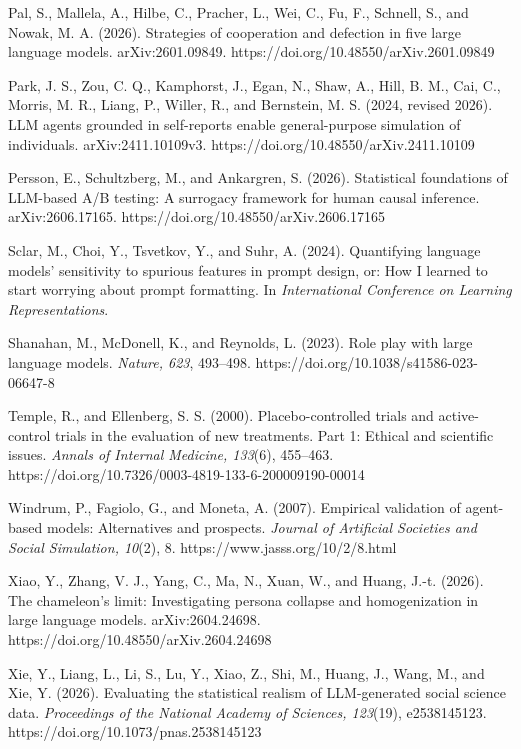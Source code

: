 \documentclass[
  11pt]{article}
\begin{document}
Pal, S., Mallela, A., Hilbe, C., Pracher, L., Wei, C., Fu, F., Schnell,
S., and Nowak, M. A. (2026). Strategies of cooperation and defection in
five large language models. arXiv:2601.09849.
https://doi.org/10.48550/arXiv.2601.09849

Park, J. S., Zou, C. Q., Kamphorst, J., Egan, N., Shaw, A., Hill, B. M.,
Cai, C., Morris, M. R., Liang, P., Willer, R., and Bernstein, M. S.
(2024, revised 2026). LLM agents grounded in self-reports enable
general-purpose simulation of individuals. arXiv:2411.10109v3.
https://doi.org/10.48550/arXiv.2411.10109

Persson, E., Schultzberg, M., and Ankargren, S. (2026). Statistical
foundations of LLM-based A/B testing: A surrogacy framework for human
causal inference. arXiv:2606.17165.
https://doi.org/10.48550/arXiv.2606.17165

Sclar, M., Choi, Y., Tsvetkov, Y., and Suhr, A. (2024). Quantifying
language models' sensitivity to spurious features in prompt design, or:
How I learned to start worrying about prompt formatting. In
\emph{International Conference on Learning Representations}.

Shanahan, M., McDonell, K., and Reynolds, L. (2023). Role play with
large language models. \emph{Nature, 623}, 493--498.
https://doi.org/10.1038/s41586-023-06647-8

Temple, R., and Ellenberg, S. S. (2000). Placebo-controlled trials and
active-control trials in the evaluation of new treatments. Part 1:
Ethical and scientific issues. \emph{Annals of Internal Medicine,
133}(6), 455--463.
https://doi.org/10.7326/0003-4819-133-6-200009190-00014

Windrum, P., Fagiolo, G., and Moneta, A. (2007). Empirical validation of
agent-based models: Alternatives and prospects. \emph{Journal of
Artificial Societies and Social Simulation, 10}(2), 8.
https://www.jasss.org/10/2/8.html

Xiao, Y., Zhang, V. J., Yang, C., Ma, N., Xuan, W., and Huang, J.-t.
(2026). The chameleon's limit: Investigating persona collapse and
homogenization in large language models. arXiv:2604.24698.
https://doi.org/10.48550/arXiv.2604.24698

Xie, Y., Liang, L., Li, S., Lu, Y., Xiao, Z., Shi, M., Huang, J., Wang,
M., and Xie, Y. (2026). Evaluating the statistical realism of
LLM-generated social science data. \emph{Proceedings of the National
Academy of Sciences, 123}(19), e2538145123.
https://doi.org/10.1073/pnas.2538145123

\endgroup
\end{document}
